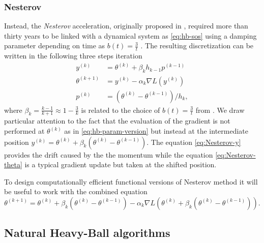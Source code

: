 \documentclass{article}
\theoremstyle{noparens}
\newcommand{\paramk}{\theta^{(k)}}
\newcommand{\paramkm}{\theta^{(k-1)}}
\newcommand{\paramkp}{\theta^{(k+1)}}
\newcommand{\yk}{y^{(k)}}
\newcommand{\pk}{p^{(k)}}
\newcommand{\pkm}{p^{(k-1)}}
\newcommand{\GradP}{\nabla}
\newcommand{\LossGrad}{\GradP L}
\begin{document}
\subsubsection{Nesterov}
Instead, the \textit{Nesterov} acceleration, originally proposed in \cite{nesterovMethodSolvingConvex1983}, required more than thirty years to be linked with a  dynamical system as \eqref{eq:hb-sos} using a  damping parameter depending on time as $b(t)=\frac 3 t$ \cite{suDifferentialEquationModeling2015}. The resulting discretization can be written in the following three steps iteration
\begin{subequations}
\begin{align}
    \yk &= \paramk + \beta_k h_{k-1} \pkm
    \label{eq:Nesterov-y} \\
    \paramkp &= \yk-\alpha_k\LossGrad(\yk) \label{eq:Nesterov-theta}\\
    \pk &= (\paramk - \paramkm)/h_k,
\end{align}
\end{subequations}
where $\beta_k=\frac{k-1}{k+1}\approx 1-\frac 3 k$ is related to the choice of $b(t)=\frac 3 t$ from \cite{suDifferentialEquationModeling2015}. We draw particular attention to the fact that the evaluation of the gradient is not performed at $\paramk$ as in \eqref{eq:hb-param-version} but instead at the intermediate position $\yk=\paramk+\beta_k(\paramk - \paramkm)$. The equation \eqref{eq:Nesterov-y} provides  the drift caused by the the momentum while the equation \eqref{eq:Nesterov-theta} is a typical gradient update but taken at the shifted position.

To design computationally efficient functional versions of Nesterov method it will be useful to work with the combined equation
\begin{equation}
    \paramkp = \paramk + \beta_k(\paramk - \paramkm)-\alpha_k\LossGrad(\paramk + \beta_k(\paramk - \paramkm)) \label{eq:Nesterov-combined}.
\end{equation}





\subsection{Natural Heavy-Ball algorithms}
\label{sec:heavy-ball}
\end{document}
